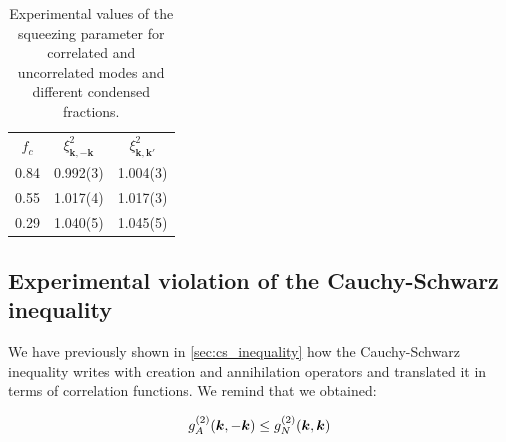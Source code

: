 \begin{table}[ht!]
    \centering
    {
    \begin{tabular}{ c|c|c }
        {\color{MainColor} $f_c$} & {\color{MainColor}$\xi^2_{\bm{k},-\bm{k}}$ } & {\color{MainColor}$\xi^2_{\bm{k},\bm{k}'}$} \\
        0.84 & 0.992(3) & 1.004(3) \\
        0.55 & 1.017(4) & 1.017(3) \\
        0.29 & 1.040(5) & 1.045(5) \\

    \end{tabular}}
    \caption{Experimental values of the squeezing parameter for correlated and uncorrelated modes and different condensed fractions.}
    \label{tab:squeezing}
\end{table}



\subsection{Experimental violation of the Cauchy-Schwarz inequality}

We have previously shown in \ref{sec:cs_inequality} how the Cauchy-Schwarz inequality writes with creation and annihilation operators and translated it in terms of correlation functions. We remind that we obtained:

\begin{equation}
    g^{(2)}_A (\bm{k},-\bm{k}) \leq g^{(2)}_N (\bm{k},\bm{k})
\end{equation}

